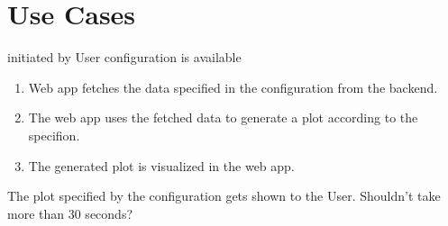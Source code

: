 \section{Use Cases}
{initiated by User}
{configuration is available}
{\begin{enumerate}
    \item Web app fetches the data specified in the configuration from the backend.
    \item The web app uses the fetched data to generate a plot according to the specifion.
    \item The generated plot is visualized in the web app.
\end{enumerate}}
{The plot specified by the configuration gets shown to the User.}
{Shouldn't take more than 30 seconds?}
